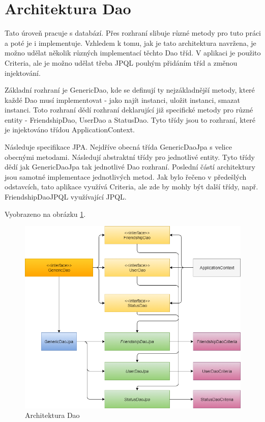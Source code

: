 \documentclass[
12pt,
a4paper,
pdftex,
czech,
titlepage
]{report}
\begin{document}
\section{Architektura Dao}
Tato úroveň pracuje s databází. Přes rozhraní slibuje různé metody pro tuto práci a poté je i implementuje. Vzhledem k tomu, jak je tato architektura navržena, je možno udělat několik různých implementací těchto Dao tříd. V aplikaci je použito Criteria, ale je možno udělat třeba JPQL pouhým přidáním tříd a změnou injektování. 

Základní rozhraní je GenericDao, kde se definují ty nejzákladnější metody, které každé Dao musí implementovat - jako najít instanci, uložit instanci, smazat instanci. Toto rozhraní dědí rozhraní deklarující již specifické metody pro různé entity - FriendshipDao, UserDao a StatusDao. Tyto třídy jsou to rozhraní, které je injektováno třídou ApplicationContext.

Následuje specifikace JPA. Nejdříve obecná třída GenericDaoJpa s velice obecnými metodami. Následují abstraktní třídy pro jednotlivé entity. Tyto třídy dědí jak GenericDaoJpa tak jednotlivé Dao rozhraní. Poslední částí architektury jsou samotné implementace jednotlivých metod. Jak bylo řečeno v předešlých odstavcích, tato aplikace využívá Criteria, ale zde by mohly být další třídy, např. FriendshipDaoJPQL využívající JPQL. 

Vyobrazeno na obrázku \ref{dao}.

\begin{figure}[H]
\caption{Architektura Dao}
\label{dao}
\includegraphics[width=\textwidth]{dao.png}
\end{figure}
\end{document}
